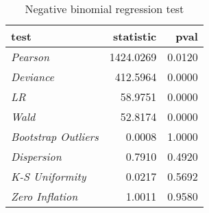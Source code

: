 \begin{wraptable}{r}{2.5in}

\caption{\label{tab:negbin_reg_tests}Negative binomial regression test}
\centering
\fontsize{9}{11}\selectfont
\begin{tabular}[t]{>{}lrr}
\toprule
test & statistic & pval\\
\midrule
\em{Pearson} & 1424.0269 & 0.0120\\
\em{Deviance} & 412.5964 & 0.0000\\
\em{LR} & 58.9751 & 0.0000\\
\em{Wald} & 52.8174 & 0.0000\\
\em{Bootstrap Outliers} & 0.0008 & 1.0000\\
\addlinespace
\em{Dispersion} & 0.7910 & 0.4920\\
\em{K-S Uniformity} & 0.0217 & 0.5692\\
\em{Zero Inflation} & 1.0011 & 0.9580\\
\bottomrule
\end{tabular}
\end{wraptable}
